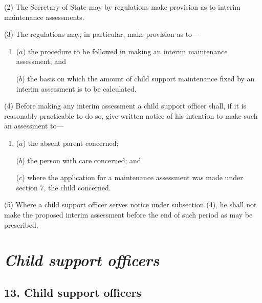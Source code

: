 \documentclass[12pt,a4paper]{article}
\begin{document}
(2) The Secretary of State may by regulations make provision as to interim maintenance assessments.

(3) The regulations may, in particular, make provision as to—
\begin{enumerate}\item[]
($a$) the procedure to be followed in making an interim maintenance assessment; and

($b$) the basis on which the amount of child support maintenance fixed by an interim assessment is to be calculated.
\end{enumerate}

(4) Before making any interim assessment 
a child support officer 
shall, if it is reasonably practicable to do so, give written notice of his intention to make such an assessment to—
\begin{enumerate}\item[]
($a$) the absent parent concerned;

($b$) the person with care concerned; and

($c$) where the application for a maintenance assessment was made under section 7, the child concerned.
\end{enumerate}

(5) Where 
a child support officer 
serves notice under subsection (4), he shall not make the proposed interim assessment before the end of such period as may be prescribed.


\section{\itshape Child support officers}

\subsection{13. Child support officers}
\end{document}
